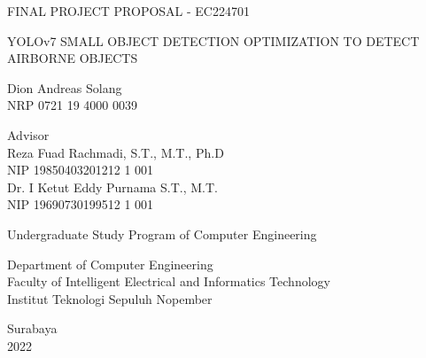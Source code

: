 \begin{large}
  FINAL PROJECT PROPOSAL - EC224701
\end{large}

\vspace{\fill}

\begin{spacing}{1.5}
  \begin{Large}
    YOLOv7 SMALL OBJECT DETECTION OPTIMIZATION 
    TO DETECT AIRBORNE OBJECTS
  \end{Large}
\end{spacing}

\vspace{\fill}

\begin{large}
  Dion Andreas Solang \\
  \textnormal{NRP 0721 19 4000 0039}
\end{large}

\vspace{\fill}

\begin{large}
  \textnormal{Advisor} \\
  Reza Fuad Rachmadi, S.T., M.T., Ph.D \\
  \textnormal{NIP 19850403201212 1 001} \\
  Dr. I Ketut Eddy Purnama S.T., M.T. \\
  \textnormal{NIP 19690730199512 1 001}
\end{large}

\vspace{\fill}

Undergraduate Study Program of Computer Engineering \\

\normalfont

Department of Computer Engineering \\
Faculty of Intelligent Electrical and Informatics Technology\\
Institut Teknologi Sepuluh Nopember

Surabaya \\
2022

